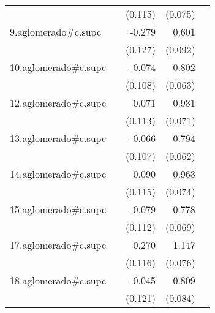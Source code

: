 {\begin{longtable}{l*{4}{D{.}{.}{-1}}}
            &                     &     (0.115)         &     (0.075)         &                     \\
\addlinespace
9.aglomerado#c.supc&                     &      -0.279\sym{*}  &       0.601\sym{***}&                     \\
            &                     &     (0.127)         &     (0.092)         &                     \\
\addlinespace
10.aglomerado#c.supc&                     &      -0.074         &       0.802\sym{***}&                     \\
            &                     &     (0.108)         &     (0.063)         &                     \\
\addlinespace
12.aglomerado#c.supc&                     &       0.071         &       0.931\sym{***}&                     \\
            &                     &     (0.113)         &     (0.071)         &                     \\
\addlinespace
13.aglomerado#c.supc&                     &      -0.066         &       0.794\sym{***}&                     \\
            &                     &     (0.107)         &     (0.062)         &                     \\
\addlinespace
14.aglomerado#c.supc&                     &       0.090         &       0.963\sym{***}&                     \\
            &                     &     (0.115)         &     (0.074)         &                     \\
\addlinespace
15.aglomerado#c.supc&                     &      -0.079         &       0.778\sym{***}&                     \\
            &                     &     (0.112)         &     (0.069)         &                     \\
\addlinespace
17.aglomerado#c.supc&                     &       0.270\sym{*}  &       1.147\sym{***}&                     \\
            &                     &     (0.116)         &     (0.076)         &                     \\
\addlinespace
18.aglomerado#c.supc&                     &      -0.045         &       0.809\sym{***}&                     \\
            &                     &     (0.121)         &     (0.084)         &                     \\

\end{longtable}}
